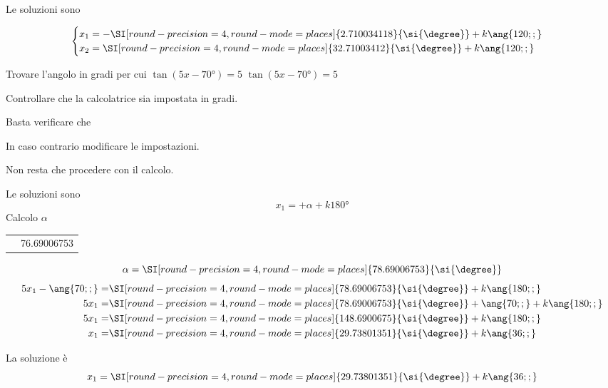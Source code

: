 \begin{exercise}
 	Le soluzioni sono
 	
 	\[\begin{cases}
x_1=-\SI[round-precision=\lungarrotandamento,round-mode=places]{2.710034118}{\si{\degree}}+k\ang{120;;}\\
x_2=\SI[round-precision=\lungarrotandamento,round-mode=places]{32.71003412}{\si{\degree}}+k\ang{120;;}\\
 	\end{cases}\]
 \end{exercise}
 \begin{exercise}
 	Trovare l'angolo in gradi per cui $\tan (5x-\ang{70;;})=5$
 	\tcblower
 	$\tan (5x-\ang{70;;})=5$
 	
 	Controllare che la calcolatrice sia impostata in gradi.
 	
 	Basta verificare che 
 	\testgradi
 	
 	In caso contrario modificare le impostazioni.
 	
 	Non resta che procedere con il calcolo.
 	
 	Le soluzioni sono 
 	\[x_1=+\alpha+k\ang{180;;}\]
 	Calcolo $\alpha$
 	\begin{center}
 		\begin{tabular}{ll}
 			\tastoitan\tasto{\num[round-precision=1,round-mode=places]{5}}
 			\tastouguale&\num[round-precision=\lungarrotandamento,round-mode=places]{76.69006753} 
 		\end{tabular} 
 	\end{center}
 	\[\alpha=\SI[round-precision=\lungarrotandamento,round-mode=places]{78.69006753}{\si{\degree}}\]
 	\begin{align*}
 	5x_1-\ang{70;;}=&\SI[round-precision=\lungarrotandamento,round-mode=places]{78.69006753}{\si{\degree}}+k\ang{180;;}\\
 	5x_1=&\SI[round-precision=\lungarrotandamento,round-mode=places]{78.69006753}{\si{\degree}}+\ang{70;;}+k\ang{180;;}\\
 	5x_1=&\SI[round-precision=\lungarrotandamento,round-mode=places]{148.6900675}{\si{\degree}}+k\ang{180;;}\\
 	x_1=&\SI[round-precision=\lungarrotandamento,round-mode=places]{29.73801351}{\si{\degree}}+k\ang{36;;}
 	\end{align*}
 	
 	La soluzione è
 \[x_1=\SI[round-precision=\lungarrotandamento,round-mode=places]{29.73801351}{\si{\degree}}+k\ang{36;;}\]
 \end{exercise}
